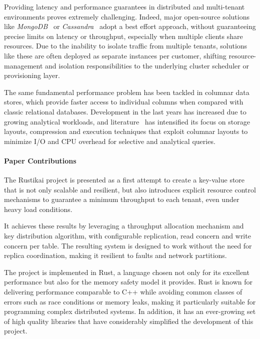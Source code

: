 Providing latency and performance guarantees in distributed and multi-tenant environments proves extremely challenging.
%
Indeed, major open-source solutions like \textit{MongoDB}~\cite{Mongo} or \textit{Cassandra}~\cite{Cassandra} adopt a best effort approach,
without guaranteeing precise limits on latency or throughput, especially when multiple clients share resources.
Due to the inability to isolate traffic from multiple tenants, solutions like these are often deployed as separate instances per customer,
shifting resource-management and isolation responsibilities to the underlying cluster scheduler or provisioning layer.

The same fundamental performance problem has been tackled in columnar data stores,
which provide faster access to individual columns when compared with classic relational databases.
Development in the last years has increased due to growing analytical workloads,
and literature~\cite{ColumnarSurvey, ColumnOrientedDatabase} has intensified its focus on storage layouts,
compression and execution techniques that exploit columnar layouts to minimize I/O and CPU overhead for selective and analytical queries.

\paragraph{Paper Contributions}
The Rustikai project is presented as a first attempt to create a key-value store that is not only scalable and resilient,
but also introduces explicit resource control mechanisms to guarantee a minimum throughput to each tenant, even under heavy load conditions.

It achieves these results by leveraging a throughput allocation mechanism and key distribution algorithm, with configurable replication, read concern and write concern per table.
The resulting system is designed to work without the need for replica coordination, making it resilient to faults and network partitions.

The project is implemented in Rust, a language chosen not only for its excellent performance but also for the memory safety model it provides.
Rust is known for delivering performance comparable to C++ while avoiding common classes of errors such as race conditions or memory leaks,
making it particularly suitable for programming complex distributed systems.
In addition, it has an ever-growing set of high quality libraries
that have considerably simplified the development of this project.

